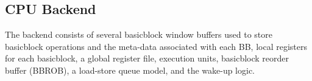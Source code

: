 \subsection{CPU Backend}
\label{sec:cpu_backend}

The backend consists of several basicblock window buffers used to store
basicblock operations and the meta-data associated with each BB, local registers
for each basicblock, a global register file, execution units, basicblock reorder
buffer (BBROB), a load-store queue model, and the wake-up logic.






